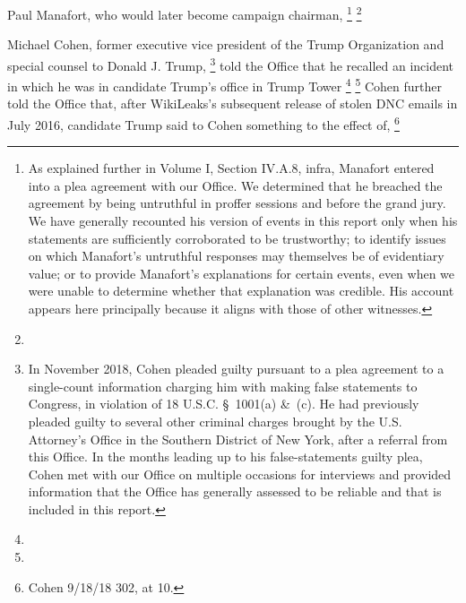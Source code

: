 Paul Manafort, who would later become campaign chairman, %
\footnote{As explained further in Volume I, Section IV.A.8, infra, Manafort entered into a plea agreement with our Office.
We determined that he breached the agreement by being untruthful in proffer sessions and before the grand jury.
We have generally recounted his version of events in this report only when his statements are sufficiently corroborated to be trustworthy;
to identify issues on which Manafort's untruthful responses may themselves be of evidentiary value;
or to provide Manafort's explanations for certain events, even when we were unable to determine whether that explanation was credible.
His account appears here principally because it aligns with those of other witnesses.}
\footnote{}

Michael Cohen, former executive vice president of the Trump Organization and special counsel to Donald J. Trump,%
\footnote{In November 2018, Cohen pleaded guilty pursuant to a plea agreement to a single-count information charging him with making false statements to Congress, in violation of 18 U.S.C. \S~1001(a) \&~(c).
He had previously pleaded guilty to several other criminal charges brought by the U.S. Attorney's Office in the Southern District of New York, after a referral from this Office.
In the months leading up to his false-statements guilty plea, Cohen met with our Office on multiple occasions for interviews and provided information that the Office has generally assessed to be reliable and that is included in this report.}
told the Office that he recalled an incident in which he was in candidate Trump's office in Trump Tower
\footnote{}
\footnote{}
Cohen further told the Office that, after WikiLeaks's subsequent release of stolen DNC emails in July 2016, candidate Trump said to Cohen something to the effect of, %
\footnote{Cohen 9/18/18 302, at 10.
  }

